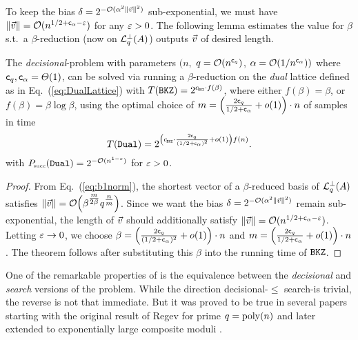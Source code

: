 To keep the bias $\delta = 2^{-\bigO(\alpha^2 \| \vvec \|^2)}$ sub-exponential, we must have $\| \vvec \| = \bigO(n^{1/2+\ca - \eps})$ for any $\varepsilon>0$. The following lemma estimates the value for $\beta$ s.t.\ a $\beta$-\BKZ reduction (now on $\mathcal{L}_q^{\perp} (A)$) outputs $\vvec$ of desired length. 

\begin{lemma} \label{lem:DecisionalLWE}
The \emph{decisional}-\LWE problem with parameters $(n,$ $q=\mathcal{O}(n^{\mathsf{c}_q})$, $\alpha = \mathcal{O}(1 / n^{\mathsf{c}_{\alpha}}) )$ where $\mathsf{c}_q, \mathsf{c}_{\alpha} = \varTheta(1)$, can be solved via running a $\beta$-\BKZ reduction on the \emph{dual} lattice defined as in Eq.~(\ref{eq:DualLattice}) with $T(\BKZ) = 2^{\cBKZ \cdot f(\beta)}$, where either $f(\beta) = \beta$, or $f(\beta) = \beta \log \beta$, using the optimal choice of $m = \left( \frac{2 \mathsf{c}_q}{1/2 + \mathsf{c}_{\alpha}} + o(1) \right) \cdot n$ of samples in time
	\[
		T(\DUAL) = 2^{\left( \cBKZ \cdot \frac{2\cq}{(1/2+\ca)^2} + \smallo(1) \right) f(n)}.
	\]
with $P\mkern-4mu_{\mbox{\tiny succ}}(\texttt{Dual}) = 2^{-\mathcal{O}(n^{1-\varepsilon})}$ for $\varepsilon>0$.
\end{lemma}

\begin{proof}
	From Eq.~(\ref{eq:b1norm}), the shortest vector of a $\beta$-\BKZ reduced basis of $\mathcal{L}_q^{\perp} (A)$ satisfies $\| \vvec \| =\bigO \Bigl(\beta^{\tfrac{m}{2 \beta}} q^{\tfrac{n}{m}}\Bigr)$. Since we want the bias $\delta = 2^{-\bigO(\alpha^2 \| \vvec \|^2)}$ remain sub-exponential, the length of $\vvec$ should additionally satisfy $\|\vvec \|= \bigO(n^{1/2+\ca - \eps})$. Letting $\varepsilon \rightarrow 0$, we choose $\beta = \left( \frac{2 \mathsf{c}_q}{(1/2 + \mathsf{c}_{\alpha})^2} + o(1) \right) \cdot n$ and $m = \left( \frac{2 \mathsf{c}_q}{1/2 + \mathsf{c}_{\alpha}} + o(1) \right) \cdot n$. The theorem follows after substituting this $\beta$ into the running time of $\texttt{BKZ}$.
\end{proof}

One of the remarkable properties of \LWE is the equivalence between the \emph{decisional} and \emph{search} versions of the problem. While the direction decisional-\LWE $\leq$ search-\LWE is trivial, the reverse is not that immediate. But it was proved to be true in several papers starting with the original result of Regev \cite{STOC:Regev05} for prime $q = \mathrm{poly}(n)$ and later extended to exponentially large composite moduli \cite{EC:MicPei12}. 

